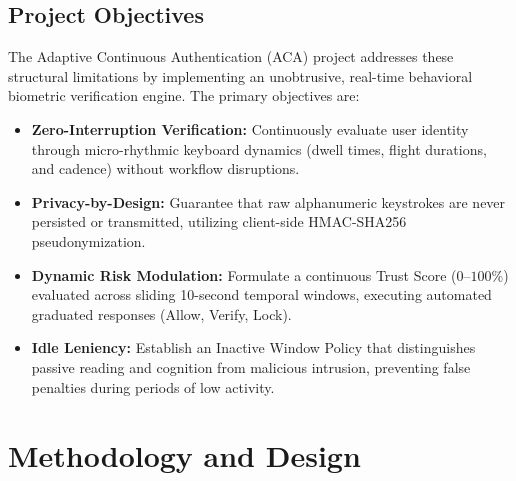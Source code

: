 \documentclass[12pt, a4paper, oneside]{report}
\begin{document}
\section{Project Objectives}
The Adaptive Continuous Authentication (ACA) project addresses these structural limitations by implementing an unobtrusive, real-time behavioral biometric verification engine. The primary objectives are:
\begin{itemize}
    \item \textbf{Zero-Interruption Verification:} Continuously evaluate user identity through micro-rhythmic keyboard dynamics (dwell times, flight durations, and cadence) without workflow disruptions.
    \item \textbf{Privacy-by-Design:} Guarantee that raw alphanumeric keystrokes are never persisted or transmitted, utilizing client-side HMAC-SHA256 pseudonymization.
    \item \textbf{Dynamic Risk Modulation:} Formulate a continuous Trust Score ($0$--$100\%$) evaluated across sliding 10-second temporal windows, executing automated graduated responses (Allow, Verify, Lock).
    \item \textbf{Idle Leniency:} Establish an Inactive Window Policy that distinguishes passive reading and cognition from malicious intrusion, preventing false penalties during periods of low activity.
\end{itemize}

\chapter{Methodology and Design}
\end{document}
